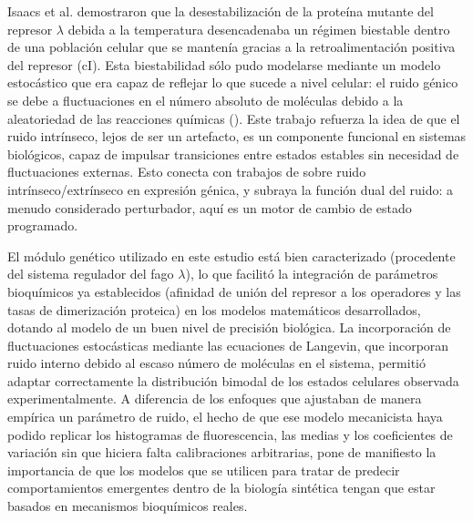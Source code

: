 \documentclass[nochap]{config/ejercicios}
\begin{document}
Isaacs et al. demostraron que la desestabilización de la proteína mutante del represor $\lambda$ debida a la temperatura desencadenaba un régimen biestable dentro de una población celular que se mantenía gracias a la retroalimentación positiva del represor (cI). Esta biestabilidad sólo pudo modelarse mediante un modelo estocástico que era capaz de reflejar lo que sucede a nivel celular: el ruido génico se debe a fluctuaciones en el número absoluto de moléculas debido a la aleatoriedad de las reacciones químicas (\cite{Ozbudak2002}). Este trabajo refuerza la idea de que el ruido intrínseco, lejos de ser un artefacto, es un componente funcional en sistemas biológicos, capaz de impulsar transiciones entre estados estables sin necesidad de fluctuaciones externas. Esto conecta con trabajos de \cite{Elowitz2000} sobre ruido intrínseco/extrínseco en expresión génica, y subraya la función dual del ruido: a menudo considerado perturbador, aquí es un motor de cambio de estado programado.



El módulo genético utilizado en este estudio está bien caracterizado (procedente del sistema regulador del fago $\lambda$), lo que facilitó la integración de parámetros bioquímicos ya establecidos (afinidad de unión del represor a los operadores y las tasas de dimerización proteica) en los modelos matemáticos desarrollados, dotando al modelo de un buen nivel de precisión biológica. La incorporación de fluctuaciones estocásticas mediante las ecuaciones de Langevin, que incorporan ruido interno debido al escaso número de moléculas en el sistema, permitió adaptar correctamente la distribución bimodal de los estados celulares observada experimentalmente. A diferencia de los enfoques que ajustaban de manera empírica un parámetro de ruido, el hecho de que ese modelo mecanicista haya podido replicar los histogramas de fluorescencia, las medias y los coeficientes de variación sin que hiciera falta calibraciones arbitrarias, pone de manifiesto la importancia de que los modelos que se utilicen para tratar de predecir comportamientos emergentes dentro de la biología sintética tengan que estar basados en mecanismos bioquímicos reales.
\end{document}
